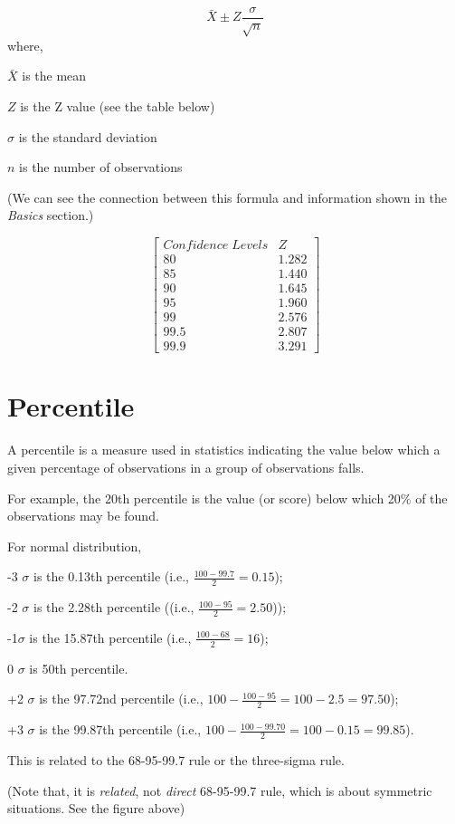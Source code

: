 \documentclass[]{book}
\begin{document}
\[\bar{X} \pm Z \frac{\sigma}{\sqrt{n}}\]
where,

\(\bar{X}\) is the mean

\(Z\) is the Z value (see the table below)

\(\sigma\) is the standard deviation

\(n\) is the number of observations

(We can see the connection between this formula and information shown in the \emph{Basics} section.)

\[\begin{bmatrix}
Confidence \; Levels & Z \\
80  & 1.282 \\
85 & 1.440 \\
90 & 1.645 \\
95 & 1.960 \\
99 & 2.576 \\
99.5 & 2.807 \\
99.9 & 3.291 \end{bmatrix}\]

\hypertarget{percentile}{%
\section{Percentile}\label{percentile}}

A percentile is a measure used in statistics indicating the value below which a given percentage of observations in a group of observations falls.

For example, the 20th percentile is the value (or score) below which 20\% of the observations may be found.

For normal distribution,

-3 \(\sigma\) is the 0.13th percentile (i.e., \(\frac{100-99.7}{2}=0.15\));

-2 \(\sigma\) is the 2.28th percentile ((i.e., \(\frac{100-95}{2}=2.50\)));

-1\(\sigma\) is the 15.87th percentile (i.e., \(\frac{100-68}{2}=16\));

0 \(\sigma\) is 50th percentile.

+2 \(\sigma\) is the 97.72nd percentile (i.e., \(100-\frac{100-95}{2}=100-2.5=97.50\));

+3 \(\sigma\) is the 99.87th percentile (i.e., \(100-\frac{100-99.70}{2}=100-0.15=99.85\)).

This is related to the 68-95-99.7 rule or the three-sigma rule.

(Note that, it is \emph{related}, not \emph{direct} 68-95-99.7 rule, which is about symmetric situations. See the figure above)
\end{document}
